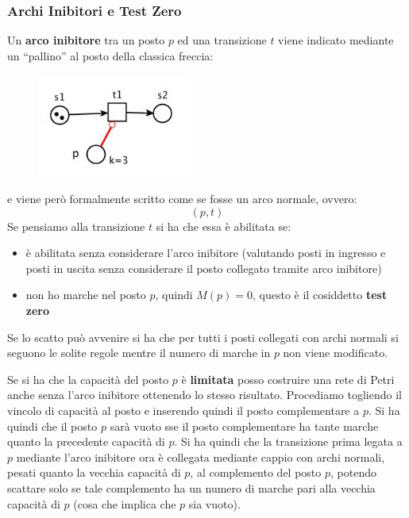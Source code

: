 \documentclass[a4paper,12pt, oneside]{book}
\begin{document}
\subsubsection{Archi Inibitori e Test Zero}
\begin{definizione}
  Un\textbf{ arco inibitore} tra un posto $p$ ed una transizione $t$ viene
  indicato mediante un ``pallino'' al posto della classica freccia:
  \begin{figure}[H]
    \centering
    \includegraphics[scale = 0.7]{img/inib.jpg}
  \end{figure}
  e viene però formalmente scritto come se fosse un arco normale, ovvero:
  \[(p,t)\]
  Se pensiamo alla transizione $t$ si ha che essa è abilitata se:
  \begin{itemize}
    \item è abilitata senza considerare l’arco inibitore (valutando posti in
    ingresso e posti in uscita senza considerare il posto collegato tramite arco
    inibitore)
    \item non ho marche nel posto $p$, quindi $M(p)=0$, questo è il cosiddetto
    \textbf{test zero}
  \end{itemize}
  Se lo scatto può avvenire si ha che per tutti i posti collegati con archi
  normali si seguono le solite regole mentre il numero di marche in $p$ non
  viene modificato.
\end{definizione}
Se si ha che la capacità del posto $p$ è \textbf{limitata} posso costruire una
rete di Petri anche senza l'arco inibitore ottenendo lo stesso
risultato. Procediamo togliendo il vincolo di capacità al posto e inserendo
quindi il posto complementare a $p$. Si ha quindi che il posto $p$ sarà vuoto
sse il posto complementare ha tante marche quanto la precedente capacità di
$p$. Si ha quindi che la transizione prima legata a $p$ mediante l'arco
inibitore ora è collegata mediante cappio con archi normali, pesati quanto la
vecchia capacità di $p$, al complemento del posto $p$, potendo scattare solo se
tale complemento ha un numero di marche pari alla vecchia capacità di $p$ (cosa
che implica che $p$ sia vuoto).
\end{document}
